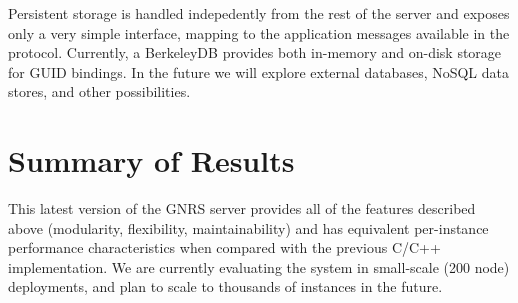 \documentclass{article}
\begin{document}
Persistent storage is handled indepedently from the rest of the server and
exposes only a very simple interface, mapping to the application messages
available in the protocol.  Currently, a BerkeleyDB provides both in-memory
and on-disk storage for GUID bindings.  In the future we will explore external
databases, NoSQL data stores, and other possibilities.

\section{Summary of Results}
This latest version of the GNRS server provides all of the features described
above (modularity, flexibility, maintainability) and has equivalent
per-instance performance characteristics when compared with the previous C/C++
implementation.  We are currently evaluating the system in small-scale
(200 node) deployments, and plan to scale to thousands of instances in the
future.
\end{document}
